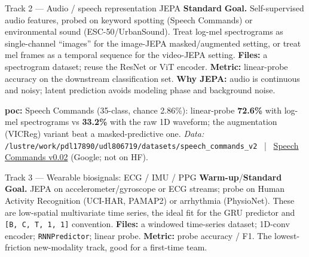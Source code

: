\documentclass{article}
\newcommand{\code}[1]{\texttt{\small #1}}
\newcommand{\diffeasy}{\colorbox{ebgreen!18}{\textcolor{ebgreen}{\small\bfseries Warm-up}}}
\newcommand{\diffmed}{\colorbox{ebamber!18}{\textcolor{ebamber}{\small\bfseries Standard}}}
\begin{document}
\begin{trackbox}{Track 2 --- Audio / speech representation JEPA \hfill \diffmed{}}
\textbf{Goal.} Self-supervised audio features, probed on keyword spotting (Speech
Commands) or environmental sound (ESC-50/UrbanSound). Treat log-mel spectrograms as
single-channel ``images'' for the image-JEPA masked/augmented setting, or treat mel
frames as a temporal sequence for the video-JEPA setting. \textbf{Files:} a
spectrogram dataset; reuse the ResNet or ViT encoder. \textbf{Metric:} linear-probe
accuracy on the downstream classification set. \textbf{Why JEPA:} audio is
continuous and noisy; latent prediction avoids modeling phase and background noise.

\smallskip
\textbf{poc:} Speech Commands (35-class, chance 2.86\%): linear-probe \textbf{72.6\%}
with log-mel spectrograms vs \textbf{33.2\%} with the raw 1D waveform; the
augmentation (VICReg) variant beat a masked-predictive one.
\emph{Data:} \code{/lustre/work/pdl17890/udl806719/datasets/speech\_commands\_v2} ~|~
\href{http://download.tensorflow.org/data/speech_commands_v0.02.tar.gz}{Speech Commands v0.02}
(Google; not on HF).
\end{trackbox}

\begin{trackbox}{Track 3 --- Wearable biosignals: ECG / IMU / PPG \hfill \diffeasy{}/\diffmed{}}
\textbf{Goal.} JEPA on accelerometer/gyroscope or ECG streams; probe on Human
Activity Recognition (UCI-HAR, PAMAP2) or arrhythmia (PhysioNet). These are
low-spatial multivariate time series, the ideal fit for the GRU predictor and
\code{[B, C, T, 1, 1]} convention. \textbf{Files:} a windowed time-series dataset;
1D-conv encoder; \code{RNNPredictor}; linear probe. \textbf{Metric:} probe accuracy
/ F1. The lowest-friction new-modality track, good for a first-time team.
\end{trackbox}
\end{document}
